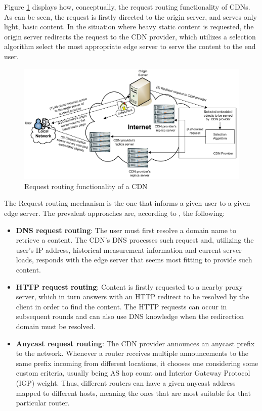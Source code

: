     Figure \ref{fig:cdn-request-routing} displays how, conceptually, the request routing functionality of CDNs.
    As can be seen, the request is firstly directed to the origin server, and serves only light, basic content.
    In the situation where heavy static content is requested, the origin server redirects the request to the CDN provider, which utilizes a selection algorithm select the most appropriate edge server to serve the content to the end user.

\begin{figure}[ht]
\centering
\includegraphics[scale=0.5]{img/cdn-request-routing.png}
\caption{Request routing functionality of a CDN}
\label{fig:cdn-request-routing}
\end{figure}

    The Request routing mechanism is the one that informs a given user to a given edge server.
    The prevalent approaches are, according to \cite{wichtlhuber2017}, the following:

\begin{itemize}
    \item \textbf{DNS request routing}: The user must first resolve a domain name to retrieve a content. The CDN's DNS processes such request and, utilizing the user's IP address, historical measurement information and current server loads, responds with the edge server that seems most fitting to provide such content.
    \item \textbf{HTTP request routing}: Content is firstly requested to a nearby proxy server, which in turn answers with an HTTP redirect to be resolved by the client in order to find the content.
        The HTTP requests can occur in subsequent rounds and can also use DNS knowledge when the redirection domain must be resolved.
    \item \textbf{Anycast request routing}: The CDN provider announces an anycast prefix to the network.
        Whenever a router receives multiple announcements to the same prefix incoming from different locations, it chooses one considering some custom criteria, usually being AS hop count and Interior Gateway Protocol (IGP) weight.
        Thus, different routers can have a given anycast address mapped to different hosts, meaning the ones that are most suitable for that particular router.
\end{itemize}{}


